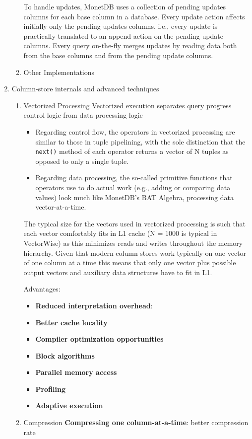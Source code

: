 \documentclass[11pt]{article}
\begin{document}
\begin{enumerate}
\begin{enumerate}
To handle updates, MonetDB uses a collection of pending updates columns for each base column in a
database. Every update action affects initially only the pending updates columns, i.e., every update is
practically translated to an append action on the pending update columns. Every query on-the-fly
merges updates by reading data both from the base columns and from the pending update columns.
\item Other Implementations
\label{sec:org4fad3d3}
\end{enumerate}
\item Column-store internals and advanced techniques
\label{sec:orgb8b0c3c}
\begin{enumerate}
\item Vectorized Processing
\label{sec:org78cfa2c}
Vectorized execution separates query progress control logic from data processing logic
\begin{itemize}
\item Regarding control flow, the operators in vectorized processing are similar to those in tuple
pipelining, with the sole distinction that the \texttt{next()} method of each operator returns a vector of N
tuples as opposed to only a single tuple.
\item Regarding data processing, the so-called primitive functions that operators use to do actual work
(e.g., adding or comparing data values) look much like MonetDB’s BAT Algebra, processing data
vector-at-a-time.
\end{itemize}

The typical size for the vectors used in vectorized processing is such that each vector comfortably
fits in L1 cache (N = 1000 is typical in VectorWise) as this minimizes reads and writes throughout the
memory hierarchy. Given that modern column-stores work typically on one vector of one column at a time
this means that only one vector plus possible output vectors and auxiliary data structures have to fit
in L1.

Advantages:
\begin{itemize}
\item \textbf{Reduced interpretation overhead}:
\item \textbf{Better cache locality}
\item \textbf{Compiler optimization opportunities}
\item \textbf{Block algorithms}
\item \textbf{Parallel memory access}
\item \textbf{Profiling}
\item \textbf{Adaptive execution}
\end{itemize}
\item Compression
\label{sec:org9789608}
\textbf{Compressing one column-at-a-time}: better compression rate


\end{enumerate}
\end{enumerate}
\end{document}
